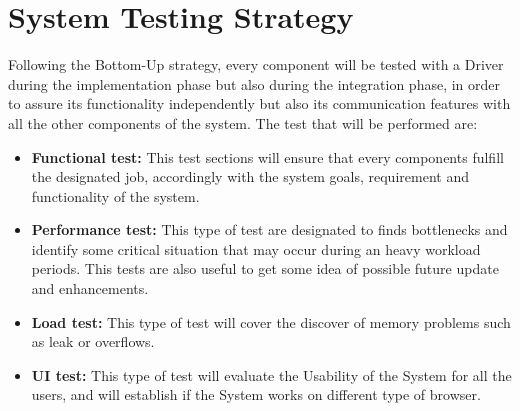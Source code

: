 \section{System Testing Strategy}
Following the Bottom-Up strategy, every component will be tested with a Driver during the implementation phase but also during the integration phase, in order to assure its functionality independently but also its communication features with all the other components of the system. The test that will be performed are:
\begin{itemize}
    \item \textbf{Functional test:}
    This test sections will ensure that every components fulfill the designated job, accordingly with the system goals, requirement and functionality of the system.
    \item \textbf{Performance test:}
    This type of test are designated to finds bottlenecks and identify some critical situation that may occur during an heavy workload periods. This tests are also useful to get some idea of possible future update and enhancements.
    \item \textbf{Load test:}
    This type of test will cover the discover of memory problems such as leak or overflows.
    \item \textbf{UI test:}
    This type of test will evaluate the Usability of the System for all the users, and will establish if the System works on different type of browser.
\end{itemize}
